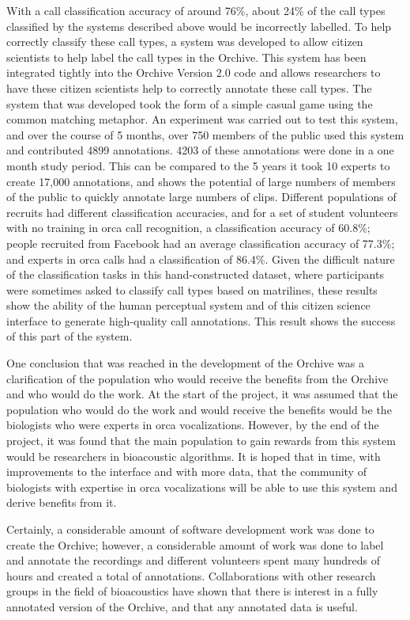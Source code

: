 \documentclass[12pt,oneside]{book}
\begin{document}
With a call classification accuracy of around 76\%, about 24\% of the
call types classified by the systems described above would be incorrectly
labelled.  To help correctly classify these call types, a system was
developed to allow citizen scientists to help label the call types in the
Orchive.  This system has been integrated tightly into the Orchive
Version 2.0 code and allows researchers to have these citizen
scientists help to correctly annotate these call types.  The system that
was developed took the form of a simple casual game using the common
matching metaphor.  An experiment was carried out to test this system,
and over the course of 5 months, over 750 members of the public used
this system and contributed 4899 annotations.  4203 of these
annotations were done in a one month study period.  This can be
compared to the 5 years it took 10 experts to create 17,000
annotations, and shows the potential of large numbers of members of
the public to quickly annotate large numbers of clips.  Different
populations of recruits had different classification accuracies, and
for a set of student volunteers with no training in orca call
recognition, a classification accuracy of 60.8\%; people recruited
from Facebook had an average classification accuracy of 77.3\%; and
experts in orca calls had a classification of 86.4\%.  Given the
difficult nature of the classification tasks in this hand-constructed
dataset, where participants were sometimes asked to classify call types
based on matrilines, these results show the ability of the human
perceptual system and of this citizen science interface to generate
high-quality call annotations.  This result shows the success of this
part of the system.

One conclusion that was reached in the development of the Orchive was
a clarification of the population who would receive the benefits from
the Orchive and who would do the work.  At the start of the project,
it was assumed that the population who would do the work and would
receive the benefits would be the biologists who were experts in orca
vocalizations.  However, by the end of the project, it was found that
the main population to gain rewards from this system would be
researchers in bioacoustic algorithms.  It is hoped that in time, with
improvements to the interface and with more data, that the community
of biologists with expertise in orca vocalizations will be able to use
this system and derive benefits from it.

Certainly, a considerable amount of software development work was done
to create the Orchive; however, a considerable amount of work was done
to label and annotate the recordings and \totalExperts different
volunteers spent many hundreds of hours and created a total of
\totalAnnotations annotations.  Collaborations with other research
groups in the field of bioacoustics have shown that there is interest
in a fully annotated version of the Orchive, and that any annotated
data is useful.
\end{document}
